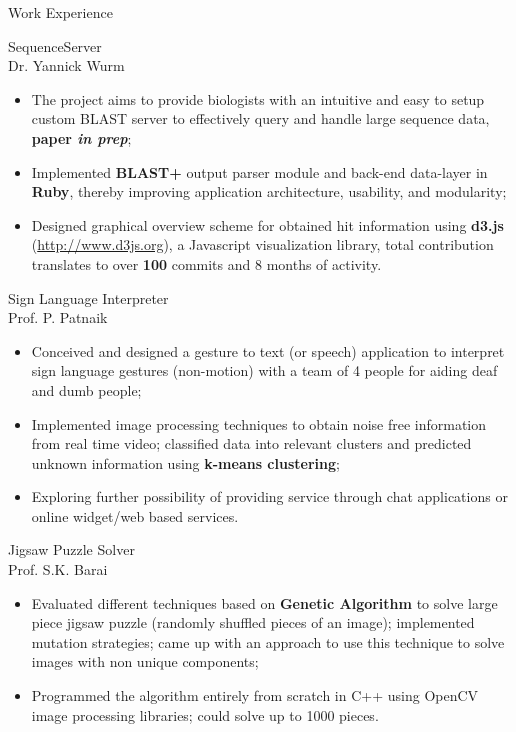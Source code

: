 \documentclass{article}
\newlength{\tabin}
\newlength{\secsep}
\newcommand{\lineunder}{\vspace*{-8pt} \\ \hspace*{-6pt} \hrulefill \\ \vspace*{-15pt}}
\newenvironment{tabbedsection}[1]{
  \begin{list}{}{
      \setlength{\itemsep}{0pt}
      \setlength{\labelsep}{0pt}
      \setlength{\labelwidth}{0pt}
      \setlength{\leftmargin}{\tabin}
      \setlength{\rightmargin}{\tabin}
      \setlength{\listparindent}{0pt}
      \setlength{\parsep}{0pt}
      \setlength{\parskip}{0pt}
      \setlength{\partopsep}{0pt}
      \setlength{\topsep}{#1}
    }
  \item[]
}{\end{list}}
\newenvironment{resume_section}[1]{
  \filbreak
  \vspace{2\secsep}
  \textsc{\large#1}
  \lineunder
  \begin{tabbedsection}{\secsep}
}{\end{tabbedsection}}
\newenvironment{resume_subsection}[2][]{
  \textbf{#2} \hfill {\footnotesize #1} \hspace*{-3.5em}
  \begin{tabbedsection}{0.5\secsep}
}{\end{tabbedsection}}
\newenvironment{subitems}{
  \renewcommand{\labelitemi}{$\cdot$}
  \begin{itemize}
      \setlength{\labelsep}{1em}
}{\end{itemize}}
\begin{document}
\begin{resume_section}  {Work Experience}
  \begin{resume_subsection}{SequenceServer \\ \footnotesize {Dr. Yannick Wurm}}
    \begin{subitems}
      \item The project aims to provide biologists with an intuitive and easy to setup custom BLAST server to effectively query and handle large sequence data, \textbf{paper \emph{in prep}};
      \item Implemented \textbf{BLAST+} output parser module and back-end data-layer in \textbf{Ruby}, thereby improving application architecture, usability, and modularity;
      \item Designed graphical overview scheme for obtained hit information using \textbf{d3.js} ({\footnotesize \url{http://www.d3js.org}}), a Javascript visualization library, total contribution translates to over \textbf{100} commits and 8 months of activity. \\
    \end{subitems}
    \end{resume_subsection}

  \begin{resume_subsection}[Apr, 2014]{Sign Language Interpreter \\ \footnotesize {Prof. P. Patnaik}}
  \begin{subitems}
    \item Conceived and designed a gesture to text (or speech) application to interpret sign language gestures (non-motion) with a team of 4 people for aiding deaf and dumb people;
    \item Implemented image processing techniques to obtain noise free information from real time video; classified data into relevant clusters and predicted unknown information using \textbf{k-means clustering};
    \item Exploring further possibility of providing service through chat applications or online widget/web based services.\\
    \end{subitems}
  \end{resume_subsection}

  \begin{resume_subsection}[Mar, 2014]{Jigsaw Puzzle Solver \\ \footnotesize {Prof. S.K. Barai}}
    \begin{subitems}
    \item Evaluated different techniques based on \textbf{Genetic Algorithm} to solve large piece jigsaw puzzle (randomly shuffled pieces of an image); implemented mutation strategies; came up with an approach to use this technique to solve images with non unique components;
    \item Programmed the algorithm entirely from scratch in C++ using OpenCV image processing libraries; could solve up to 1000 pieces.\\
    \end{subitems}
  \end{resume_subsection}


\end{resume_section}
\end{document}
